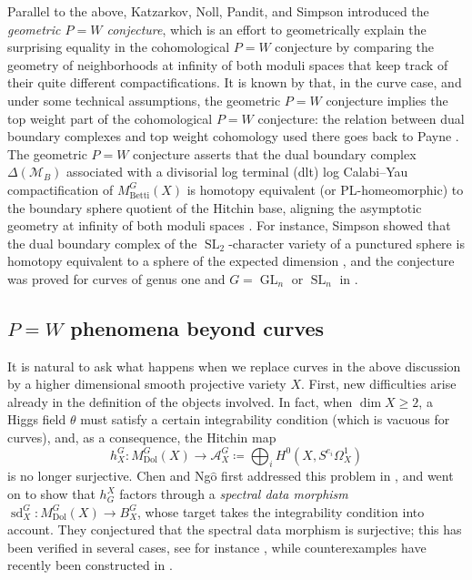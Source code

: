 \documentclass[11pt, a4paper]{amsart}
\theoremstyle{definition}
\theoremstyle{myitemstyle}
\DeclareMathOperator{\GL}{GL}
\DeclareMathOperator{\SL}{SL}
\newcommand{\Dol}{{\mathrm{Dol}}}
\newcommand{\Betti}{{\mathrm{Betti}}}
\newcommand{\sd}{{\operatorname{sd}}}
\newcommand{\mbetti}{\mathcal{M}_B}
\begin{document}
Parallel to the above, Katzarkov, Noll, Pandit, and Simpson \cite{KNPS15} introduced the \emph{geometric $P=W$ conjecture}, which is an effort to geometrically explain the surprising equality in the cohomological $P=W$ conjecture by comparing the geometry of neighborhoods at infinity of both moduli spaces that keep track of their quite different  compactifications. It is known by \cite[Theorem A]{MMS_geometricP=W} that, in the curve case, and under some technical assumptions, the geometric $P=W$ conjecture implies the top weight part of the cohomological $P=W$ conjecture: the relation between dual boundary complexes and top weight cohomology used there goes back to Payne \cite{Payne13}. 
The geometric  $P=W$ conjecture asserts that the dual boundary complex $\Delta(\mbetti)$ associated with a divisorial log terminal (dlt) log Calabi--Yau compactification of $M_{\Betti}^G(X)$ is homotopy equivalent (or PL-homeomorphic) to the boundary sphere quotient of the Hitchin base, aligning the asymptotic geometry at infinity of both moduli spaces \cite{MMS_geometricP=W}. For instance, Simpson showed that the dual boundary complex of the $\SL_2$-character variety of a punctured sphere is homotopy equivalent to a sphere of the expected dimension \cite{Simpson16}, and the conjecture was proved for curves of genus one and $G=\GL_n$ or $\SL_n$ in \cite{MMS_geometricP=W}.

\subsection*{$P=W$ phenomena beyond curves}

It is natural to ask what happens when we replace  curves in the above discussion  by a higher dimensional smooth projective variety $X$. First, new difficulties arise already in the definition of the objects involved. In fact, when $\dim X\geq 2$, a Higgs field $\theta$ must satisfy a certain integrability condition (which is vacuous for curves), and, as a consequence, the Hitchin map 
\[
h^G_X\colon M_{\Dol}^G(X)\rightarrow \mathcal{A}_X^G\coloneqq\bigoplus_i H^0(X, S^{e_i}\Omega^1_X)
\]
is no longer surjective. Chen and Ng$\hat{\mathrm{o}}$ first addressed this problem in \cite{CN20}, and went on to  show that $h_G^X$ factors through a \textit{spectral data morphism} $\sd^G_X\colon M_{\Dol}^G(X)\rightarrow B_X^G$, whose target takes the integrability condition into account. They conjectured that the spectral data morphism is surjective; this has been verified in several cases, see for instance \cite{PatelWeissmann26, SheshmaniWangXia26}, while counterexamples have recently been constructed in \cite{HeLiuZhang26}.
\end{document}
